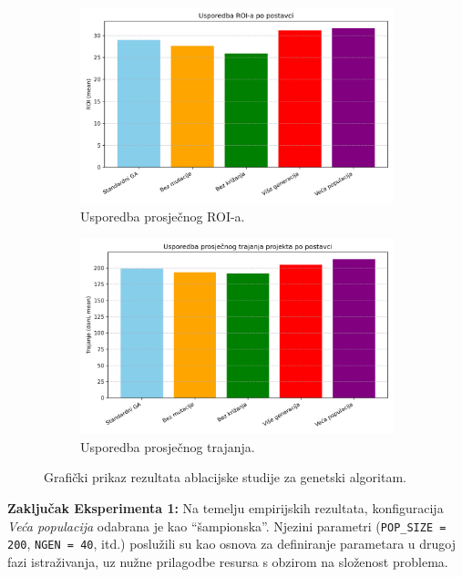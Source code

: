 \begin{figure}[H]
    \centering
    \begin{subfigure}[b]{0.48\textwidth}
        \centering
        \includegraphics[width=\textwidth]{slike/ga_usporedba_roi.png}
        \caption{Usporedba prosječnog ROI-a.}
        \label{fig:ga_roi}
    \end{subfigure}
    \hfill
    \begin{subfigure}[b]{0.48\textwidth}
        \centering
        \includegraphics[width=\textwidth]{slike/ga_usporedba_trajanje.png}
        \caption{Usporedba prosječnog trajanja.}
        \label{fig:ga_trajanje}
    \end{subfigure}
    \caption{Grafički prikaz rezultata ablacijske studije za genetski algoritam.}
    \label{fig:ga_ablation}
\end{figure}

\textbf{Zaključak Eksperimenta 1:}
Na temelju empirijskih rezultata, konfiguracija \emph{Veća populacija} odabrana je kao ``šampionska''. Njezini parametri (\texttt{POP\_SIZE = 200}, \texttt{NGEN = 40}, itd.) poslužili su kao osnova za definiranje parametara u drugoj fazi istraživanja, uz nužne prilagodbe resursa s obzirom na složenost problema.

